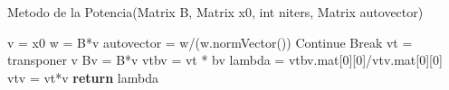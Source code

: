 
\begin{algorithm}[H]
\caption{Metodo de la Potencia(Matrix B, Matrix x0, int niters, Matrix autovector)}
\label{pseudo:Metodo de la potencia}
\begin{algorithmic}

\STATE v = x0
	\STATE w = B*v
	\STATE autovector = w/(w.normVector())
		\STATE Continue
	\ELSE
		\STATE Break
	\ENDIF
\ENDFOR
\STATE vt = transponer v 
\STATE Bv = B*v
\STATE vtbv = vt * bv
\STATE lambda = vtbv.mat[0][0]/vtv.mat[0][0]
\STATE vtv = vt*v
\STATE \textbf{return} lambda
\end{algorithmic}
\end{algorithm}
